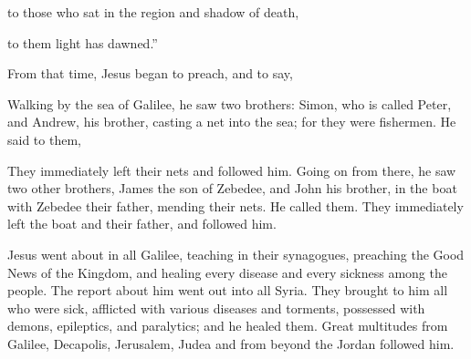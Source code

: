 {\par }{\QB to those who sat in the region and shadow of death,
\par }{\QB to them light has dawned.”
\par }{\PP {}From that time, Jesus began to preach, and to say,
{}
\par }{\PP {}Walking by the sea of Galilee, he saw two brothers: Simon, who is called Peter, and Andrew, his brother, casting a net into the sea; for they were fishermen.
He said to them,
{}
\par }{\PP {}They immediately left their nets and followed him.
Going on from there, he saw two other brothers, James the son of Zebedee, and John his brother, in the boat with Zebedee their father, mending their nets. He called them.
They immediately left the boat and their father, and followed him.
\par }{\PP {}Jesus went about in all Galilee, teaching in their synagogues, preaching the Good News of the Kingdom, and healing every disease and every sickness among the people.
The report about him went out into all Syria. They brought to him all who were sick, afflicted with various diseases and torments, possessed with demons, epileptics, and paralytics; and he healed them.
Great multitudes from Galilee, Decapolis, Jerusalem, Judea and from beyond the Jordan followed him.

}
